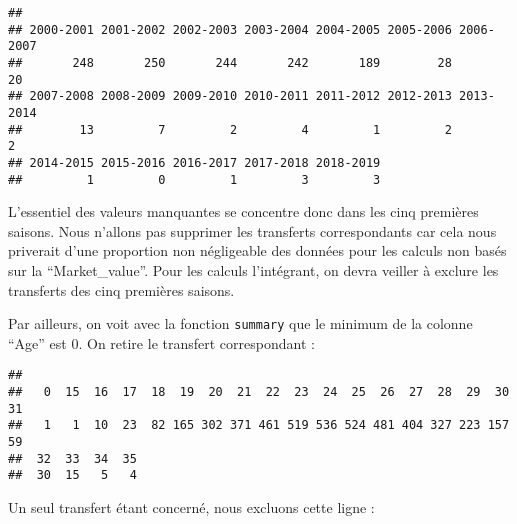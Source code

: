 \documentclass[]{article}
\newenvironment{Shaded}{\begin{snugshade}}{\end{snugshade}}
\newcommand{\DecValTok}[1]{\textcolor[rgb]{0.00,0.00,0.81}{#1}}
\newcommand{\KeywordTok}[1]{\textcolor[rgb]{0.13,0.29,0.53}{\textbf{#1}}}
\newcommand{\NormalTok}[1]{#1}
\newcommand{\OperatorTok}[1]{\textcolor[rgb]{0.81,0.36,0.00}{\textbf{#1}}}
\newcommand{\StringTok}[1]{\textcolor[rgb]{0.31,0.60,0.02}{#1}}
\begin{document}
\begin{Shaded}
\end{Shaded}

\begin{verbatim}
## 
## 2000-2001 2001-2002 2002-2003 2003-2004 2004-2005 2005-2006 2006-2007 
##       248       250       244       242       189        28        20 
## 2007-2008 2008-2009 2009-2010 2010-2011 2011-2012 2012-2013 2013-2014 
##        13         7         2         4         1         2         2 
## 2014-2015 2015-2016 2016-2017 2017-2018 2018-2019 
##         1         0         1         3         3
\end{verbatim}

L'essentiel des valeurs manquantes se concentre donc dans les cinq
premières saisons. Nous n'allons pas supprimer les transferts
correspondants car cela nous priverait d'une proportion non négligeable
des données pour les calculs non basés sur la ``Market\_value''. Pour
les calculs l'intégrant, on devra veiller à exclure les transferts des
cinq premières saisons.

Par ailleurs, on voit avec la fonction \texttt{summary} que le minimum
de la colonne ``Age'' est 0. On retire le transfert correspondant :

\begin{Shaded}
\end{Shaded}

\begin{verbatim}
## 
##   0  15  16  17  18  19  20  21  22  23  24  25  26  27  28  29  30  31 
##   1   1  10  23  82 165 302 371 461 519 536 524 481 404 327 223 157  59 
##  32  33  34  35 
##  30  15   5   4
\end{verbatim}

Un seul transfert étant concerné, nous excluons cette ligne :

\begin{Shaded}
\end{Shaded}
\end{document}
